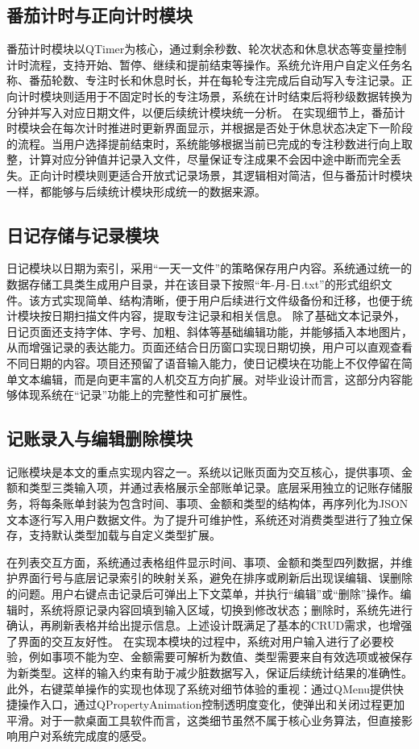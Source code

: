 \subsection{番茄计时与正向计时模块}
番茄计时模块以QTimer为核心，通过剩余秒数、轮次状态和休息状态等变量控制计时流程，支持开始、暂停、继续和提前结束等操作。系统允许用户自定义任务名称、番茄轮数、专注时长和休息时长，并在每轮专注完成后自动写入专注记录。正向计时模块则适用于不固定时长的专注场景，系统在计时结束后将秒级数据转换为分钟并写入对应日期文件，以便后续统计模块统一分析。
在实现细节上，番茄计时模块会在每次计时推进时更新界面显示，并根据是否处于休息状态决定下一阶段的流程。当用户选择提前结束时，系统能够根据当前已完成的专注秒数进行向上取整，计算对应分钟值并记录入文件，尽量保证专注成果不会因中途中断而完全丢失。正向计时模块则更适合开放式记录场景，其逻辑相对简洁，但与番茄计时模块一样，都能够与后续统计模块形成统一的数据来源。

\subsection{日记存储与记录模块}
日记模块以日期为索引，采用“一天一文件”的策略保存用户内容。系统通过统一的数据存储工具类生成用户目录，并在该目录下按照“年-月-日.txt”的形式组织文件。该方式实现简单、结构清晰，便于用户后续进行文件级备份和迁移，也便于统计模块按日期扫描文件内容，提取专注记录和相关信息。
除了基础文本记录外，日记页面还支持字体、字号、加粗、斜体等基础编辑功能，并能够插入本地图片，从而增强记录的表达能力。页面还结合日历窗口实现日期切换，用户可以直观查看不同日期的内容。项目还预留了语音输入能力，使日记模块在功能上不仅停留在简单文本编辑，而是向更丰富的人机交互方向扩展。对毕业设计而言，这部分内容能够体现系统在“记录”功能上的完整性和可扩展性。

\subsection{记账录入与编辑删除模块}
记账模块是本文的重点实现内容之一。系统以记账页面为交互核心，提供事项、金额和类型三类输入项，并通过表格展示全部账单记录。底层采用独立的记账存储服务，将每条账单封装为包含时间、事项、金额和类型的结构体，再序列化为JSON文本逐行写入用户数据文件。为了提升可维护性，系统还对消费类型进行了独立保存，支持默认类型加载与自定义类型扩展。

在列表交互方面，系统通过表格组件显示时间、事项、金额和类型四列数据，并维护界面行号与底层记录索引的映射关系，避免在排序或刷新后出现误编辑、误删除的问题。用户右键点击记录后可弹出上下文菜单，并执行“编辑”或“删除”操作。编辑时，系统将原记录内容回填到输入区域，切换到修改状态；删除时，系统先进行确认，再刷新表格并给出提示信息。上述设计既满足了基本的CRUD需求，也增强了界面的交互友好性。
在实现本模块的过程中，系统对用户输入进行了必要校验，例如事项不能为空、金额需要可解析为数值、类型需要来自有效选项或被保存为新类型。这样的输入约束有助于减少脏数据写入，保证后续统计结果的准确性。此外，右键菜单操作的实现也体现了系统对细节体验的重视：通过QMenu提供快捷操作入口，通过QPropertyAnimation控制透明度变化，使弹出和关闭过程更加平滑。对于一款桌面工具软件而言，这类细节虽然不属于核心业务算法，但直接影响用户对系统完成度的感受。

